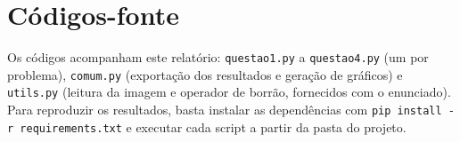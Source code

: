 \documentclass[12pt,a4paper]{article}
\begin{document}
\section*{Códigos-fonte}

Os códigos acompanham este relatório: \texttt{questao1.py} a \texttt{questao4.py} (um por problema), \texttt{comum.py} (exportação dos resultados e geração de gráficos) e \texttt{utils.py} (leitura da imagem e operador de borrão, fornecidos com o enunciado). Para reproduzir os resultados, basta instalar as dependências com \texttt{pip install -r requirements.txt} e executar cada script a partir da pasta do projeto.
\end{document}

